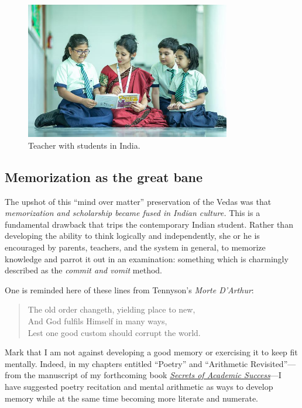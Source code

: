 \documentclass[
  a4paper,
]{article}
\begin{document}
\begin{figure}
\hypertarget{fig:teacher-students}{%
\centering
\includegraphics[width=0.8\textwidth,height=\textheight]{images/school-ga9b21f7d6_640.jpg}
\caption[Teacher with students in India.]{Teacher with students in
India.\footnotemark{}}\label{fig:teacher-students}
}
\end{figure}

\hypertarget{memorization-as-the-great-bane}{%
\subsection{Memorization as the great
bane}\label{memorization-as-the-great-bane}}

The upshot of this ``mind over matter'' preservation of the Vedas was
that \emph{memorization and scholarship became fused in Indian culture.}
This is a fundamental drawback that trips the contemporary Indian
student. Rather than developing the ability to think logically and
independently, she or he is encouraged by parents, teachers, and the
system in general, to memorize knowledge and parrot it out in an
examination: something which is charmingly described as the \emph{commit
and vomit} method.

One is reminded here of these lines from Tennyson's \emph{Morte
D'Arthur}:

\begin{quote}
The old order changeth, yielding place to new,\\
And God fulfils Himself in many ways,\\
Lest one good custom should corrupt the world.
\end{quote}

Mark that I am not against developing a good memory or exercising it to
keep fit mentally. Indeed, in my chapters entitled ``Poetry'' and
``Arithmetic Revisited''---from the manuscript of my forthcoming book
\href{\%7Bstatic\%7D/sas-manuscript/SAS-partial.pdf}{\emph{Secrets of
Academic Success}}---I have suggested poetry recitation and mental
arithmetic as ways to develop memory while at the same time becoming
more literate and numerate.
\end{document}
